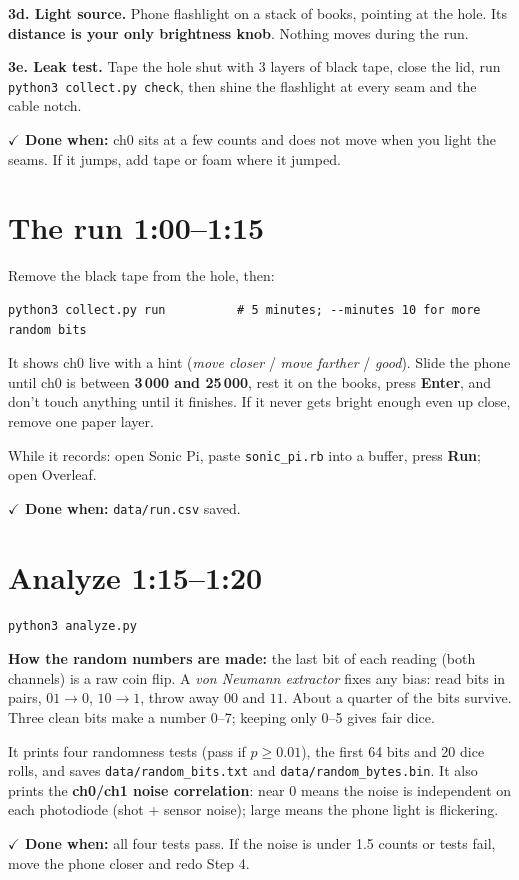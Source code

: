 \documentclass[11pt]{article}
\newcommand{\done}[1]{\par\smallskip\textcolor{ok}{\textbf{\(\checkmark\) Done when:}} #1\par}
\newcommand{\clock}[1]{\hfill\textcolor{black!55}{\small\textbf{#1}}}
\begin{document}
\textbf{3d. Light source.} Phone flashlight on a stack of books, pointing at the hole. Its \textbf{distance is your
only brightness knob}. Nothing moves during the run.

\textbf{3e. Leak test.} Tape the hole shut with 3 layers of black tape, close the lid, run
\texttt{python3 collect.py check}, then shine the flashlight at every seam and the cable notch.
\done{ch0 sits at a few counts and does not move when you light the seams. If it jumps, add tape or foam where it jumped.}

\section{The run \clock{1:00--1:15}}
Remove the black tape from the hole, then:
\begin{lstlisting}
python3 collect.py run          # 5 minutes; --minutes 10 for more random bits
\end{lstlisting}
It shows ch0 live with a hint (\emph{move closer} / \emph{move farther} / \emph{good}). Slide the phone until ch0
is between \textbf{3\,000 and 25\,000}, rest it on the books, press \textbf{Enter}, and don't touch anything until
it finishes. If it never gets bright enough even up close, remove one paper layer.

While it records: open Sonic Pi, paste \texttt{sonic\_pi.rb} into a buffer, press \textbf{Run}; open Overleaf.
\done{\texttt{data/run.csv} saved.}

\section{Analyze \clock{1:15--1:20}}
\begin{lstlisting}
python3 analyze.py
\end{lstlisting}
\textbf{How the random numbers are made:} the last bit of each reading (both channels) is a raw coin flip.
A \emph{von Neumann extractor} fixes any bias: read bits in pairs, $01\!\to\!0$, $10\!\to\!1$, throw away
$00$ and $11$. About a quarter of the bits survive. Three clean bits make a number 0--7; keeping only 0--5
gives fair dice.

It prints four randomness tests (pass if $p\ge0.01$), the first 64 bits and 20 dice rolls, and saves
\texttt{data/random\_bits.txt} and \texttt{data/random\_bytes.bin}. It also prints the \textbf{ch0/ch1 noise
correlation}: near 0 means the noise is independent on each photodiode (shot + sensor noise); large means
the phone light is flickering.
\done{all four tests pass. If the noise is under 1.5 counts or tests fail, move the phone closer and redo Step 4.}
\end{document}
